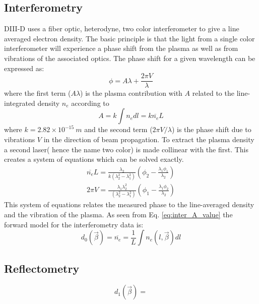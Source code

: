 \documentclass[12pt]{article}
\numberwithin{equation}{section}
\begin{document}
\subsection{Interferometry}
DIII-D uses a fiber optic, heterodyne, two color interferometer to 
give a line averaged electron density.\cite{van2006fiber} The basic 
principle is that the light from a single color interferometer will 
experience a phase shift from the plasma as well as from vibrations of 
the associated optics. The phase shift for a given wavelength can be 
expressed as:
\begin{equation} \label{eq:inter_phase}
	\phi = A \lambda + \frac{2\pi V}{\lambda}
\end{equation}
where the first term ($A\lambda$) is the plasma contribution with $A$ 
related to the line-integrated density $n_e$ according to
\begin{equation} \label{eq:inter_A_value}
	A = k \int n_e dl = k\overline{n_e}L
\end{equation}
where $k=2.82 \times 10^{-15} \:m$ and the second term ($2\pi V/
\lambda$) is the phase shift due to vibrations $V$ in the direction 
of beam propagation. To extract the plasma density a second laser( 
hence the name two color) is made collinear with the first. This 
creates a system of equations which can be solved exactly.
\begin{align} \label{eq:inter_system}
	\overline{n_e} L = \frac{\lambda_2}{k(\lambda_2^2 - \lambda_1^2)}\left( \phi_2 - \frac{\lambda_1 \phi_1}{\lambda_2}\right) \\ 
	2\pi V = \frac{\lambda_1 \lambda_2^2}{\:\:\,(\lambda_2^2 - \lambda_1^2)}\left( \phi_1 - \frac{\lambda_1 \phi_2}{\lambda_2}\right)
\end{align}
This system of equations relates the measured phase to the line-averaged density and the vibration of the plasma. 
As seen from Eq. \ref{eq:inter_A_value} the forward model for the 
interferometry data is:
\begin{equation} \label{eq:inter_model}
	d_0(\vec{\beta})=\overline{n_e} = \frac{1}{L} \int n_e(l,\vec{\beta}) dl
\end{equation}
\subsection{Reflectometry}
\begin{equation} \label{eq:refl_model}
	d_1(\vec{\beta})= 
\end{equation}
\end{document}
